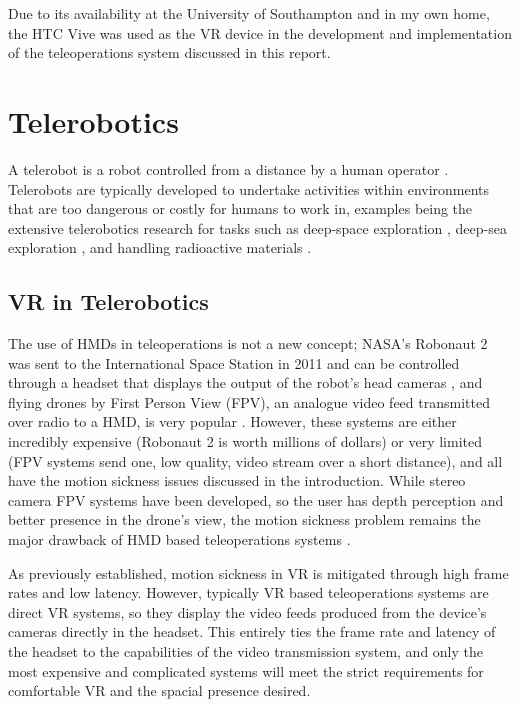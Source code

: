 Due to its availability at the University of Southampton and in my own home, the HTC Vive was used as the VR device in the development and implementation of the teleoperations system discussed in this report. 

\section{Telerobotics}

A telerobot is a robot controlled from a distance by a human operator \cite{NAP4761}. Telerobots are typically developed to undertake activities within environments that are too dangerous or costly for humans to work in, examples being the extensive telerobotics research for tasks such as deep-space exploration \cite{fong2017interactive}, deep-sea exploration \cite{huvenne2018rovs}, and handling radioactive materials \cite{smith2017radiation}.

\subsection{VR in Telerobotics}
\label{subsection:VRTele}

The use of HMDs in teleoperations is not a new concept; NASA's Robonaut 2 was sent to the International Space Station in 2011 and can be controlled through a headset that displays the output of the robot's head cameras \cite{Robonaut}, and flying drones by First Person View (FPV), an analogue video feed transmitted over radio to a HMD, is very popular \cite{FPV}. However, these systems are either incredibly expensive (Robonaut 2 is worth millions of dollars) or very limited (FPV systems send one, low quality, video stream over a short distance), and all have the motion sickness issues discussed in the introduction. While stereo camera FPV systems have been developed, so the user has depth perception and better presence in the drone's view, the motion sickness problem remains the major drawback of HMD based teleoperations systems \cite{2FPV}.

As previously established, motion sickness in VR is mitigated through high frame rates and low latency. However, typically VR based teleoperations systems are direct VR systems, so they display the video feeds produced from the device's cameras directly in the headset. This entirely ties the frame rate and latency of the headset to the capabilities of the video transmission system, and only the most expensive and complicated systems will meet the strict requirements for comfortable VR and the spacial presence desired.

